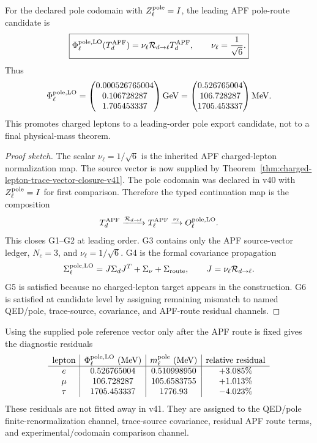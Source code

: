 \begin{theorem}\label{thm:charged-lepton-pole-route-candidate-v41}
For the declared pole codomain with \(Z_\ell^{\rm pole}=I\), the leading APF pole-route candidate is
\[
  \boxed{
  \Phi_\ell^{\rm pole,LO}(T_d^{\rm APF})
  =\nu_\ell\mathcal R_{d\to\ell}T_d^{\rm APF},
  \qquad
  \nu_\ell={1\over\sqrt6}.}
\]
Thus
\[
  \Phi_\ell^{\rm pole,LO}
  =
  \begin{pmatrix}
  0.000526765004\\
  0.106728287\\
  1.705453337
  \end{pmatrix}{\rm GeV}
  =
  \begin{pmatrix}
  0.526765004\\
  106.728287\\
  1705.453337
  \end{pmatrix}{\rm MeV}.
\]
This promotes charged leptons to a leading-order pole export candidate, not to a final physical-mass theorem.
\end{theorem}

\begin{proof}[Proof sketch]
The scalar \(\nu_\ell=1/\sqrt6\) is the inherited APF charged-lepton normalization map.  The source vector is now supplied by Theorem~\ref{thm:charged-lepton-trace-vector-closure-v41}.  The pole codomain was declared in v40 with \(Z_\ell^{\rm pole}=I\) for first comparison.  Therefore the typed continuation map is the composition
\[
  T_d^{\rm APF}\xrightarrow{\mathcal R_{d\to\ell}}T_\ell^{\rm APF}
  \xrightarrow{\nu_\ell}O_\ell^{\rm pole,LO}.
\]
This closes G1--G2 at leading order.  G3 contains only the APF source-vector ledger, \(N_c=3\), and \(\nu_\ell=1/\sqrt6\).  G4 is the formal covariance propagation
\[
  \Sigma_{\ell}^{\rm pole,LO}
  =J\Sigma_dJ^T+\Sigma_\nu+\Sigma_{\rm route},
  \qquad
  J=\nu_\ell\mathcal R_{d\to\ell}.
\]
G5 is satisfied because no charged-lepton target appears in the construction.  G6 is satisfied at candidate level by assigning remaining mismatch to named QED/pole, trace-source, covariance, and APF-route residual channels.
\end{proof}

\begin{diagnostic}\label{diag:charged-lepton-pole-residuals-v41}
Using the supplied pole reference vector only after the APF route is fixed gives the diagnostic residuals
\[
\begin{array}{c|c|c|c}
\text{lepton} & \Phi_\ell^{\rm pole,LO}\ ({\rm MeV}) & m_\ell^{\rm pole}\ ({\rm MeV}) & \text{relative residual}\\ \hline
 e   & 0.526765004 & 0.510998950 & +3.085\%\\
 \mu & 106.728287 & 105.6583755 & +1.013\%\\
 \tau& 1705.453337 & 1776.93 & -4.023\%
\end{array}
\]
These residuals are not fitted away in v41.  They are assigned to the QED/pole finite-renormalization channel, trace-source covariance, residual APF route terms, and experimental/codomain comparison channel.
\end{diagnostic}

